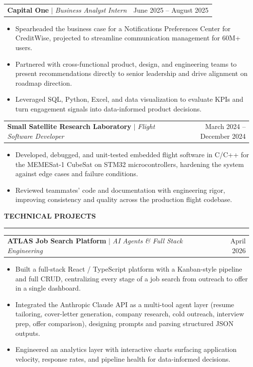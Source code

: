 \documentclass[letterpaper,10pt]{article}
\makeatletter
\newcommand{\sectiontitle}[1]{%
  \vspace{6pt}%
  {\textbf{\large #1}}\par
  \vspace{-6pt}%
  \rule{\textwidth}{0.4pt}\par
  \vspace{3pt}%
}
\newcommand{\experienceheading}[4]{%
  \begin{tabularx}{\textwidth}{@{}X r@{}}%
    \textbf{#1} $|$ \textit{#2} & #4 \\%
  \end{tabularx}\par
  \vspace{1.5pt}%
}
\newcommand{\projectheading}[3]{%
  \begin{tabularx}{\textwidth}{@{}X r@{}}
    \textbf{#1} $|$ \textit{#2} & #3 \\
  \end{tabularx}\par
  \vspace{1.5pt}%
}
\makeatother
\begin{document}
\experienceheading{Capital One}{Business Analyst Intern}{McLean, VA}{June 2025 -- August 2025}
\begin{itemize}
    \item Spearheaded the business case for a Notifications Preferences Center for CreditWise, projected to streamline communication management for 60M+ users.
    \item Partnered with cross-functional product, design, and engineering teams to present recommendations directly to senior leadership and drive alignment on roadmap direction.
    \item Leveraged SQL, Python, Excel, and data visualization to evaluate KPIs and turn engagement signals into data-informed product decisions.
\end{itemize}

\experienceheading{Small Satellite Research Laboratory}{Flight Software Developer}{Athens, GA}{March 2024 -- December 2024}
\begin{itemize}
    \item Developed, debugged, and unit-tested embedded flight software in C/C++ for the MEMESat-1 CubeSat on STM32 microcontrollers, hardening the system against edge cases and failure conditions.
    \item Reviewed teammates' code and documentation with engineering rigor, improving consistency and quality across the production flight codebase.
\end{itemize}

\sectiontitle{TECHNICAL PROJECTS}

\projectheading{ATLAS Job Search Platform}{AI Agents \& Full Stack Engineering}{April 2026}
\begin{itemize}
    \item Built a full-stack React / TypeScript platform with a Kanban-style pipeline and full CRUD, centralizing every stage of a job search from outreach to offer in a single dashboard.
    \item Integrated the Anthropic Claude API as a multi-tool agent layer (resume tailoring, cover-letter generation, company research, cold outreach, interview prep, offer comparison), designing prompts and parsing structured JSON outputs.
    \item Engineered an analytics layer with interactive charts surfacing application velocity, response rates, and pipeline health for data-informed decisions.
\end{itemize}
\end{document}
